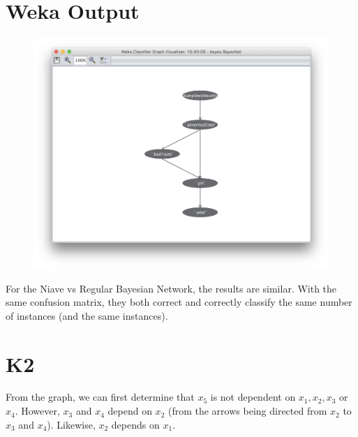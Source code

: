 \documentclass[12pt]{scrartcl}
\begin{document}
\section{Weka Output}
\begin{figure}[H]
    \centering
    \includegraphics[width=0.8\linewidth]{assets/example-3}
\end{figure}

For the Niave vs Regular Bayesian Network, the results are similar. With the same confusion matrix, they both correct and correctly classify the same number of instances (and the same instances).

\section{K2}
From the graph, we can first determine that $x_5$ is not dependent on $x_1, x_2, x_3$ or $x_4$. However, $x_3$ and $x_4$ depend on $x_2$ (from the arrows being directed from $x_2$ to $x_3$ and $x_4$). Likewise, $x_2$ depends on $x_1$.
\end{document}
